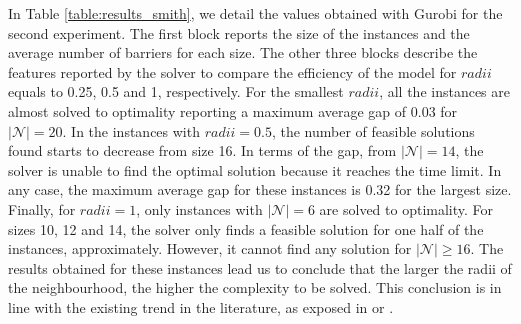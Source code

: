 \documentclass[a4paper,  review, authoryear, 1p.]{elsarticle}
\begin{document}
In Table \ref{table:results_smith}, we detail the values obtained with Gurobi for the second experiment. The first block reports the size of the instances and the average number of barriers for each size. The other three blocks describe the features reported by the solver to compare the efficiency of the model for $radii$ equals to 0.25, 0.5 and 1, respectively. For the smallest $radii$, all the instances are almost solved to optimality reporting a maximum average gap of 0.03 for $|\mathcal N|=20$. In the instances with $radii=0.5$, the number of feasible solutions found starts to decrease from size 16. In terms of the gap, from $|\mathcal N|=14$, the solver is unable to find the optimal solution because it reaches the time limit. In any case, the maximum average gap for these instances is 0.32 for the largest size. Finally, for $radii=1$, only instances with $|\mathcal N|=6$ are solved to optimality. For sizes 10, 12 and 14, the solver only finds a feasible solution for one half of the instances, approximately. However, it cannot find any solution for $|\mathcal N|\geq 16$. The results obtained for these instances lead us to conclude that the larger the radii of the neighbourhood, the higher the complexity to be solved. This conclusion is in line with the existing trend in the literature, as exposed in \citet{puerto2022c} or \citet{blanco2017}.
\end{document}
